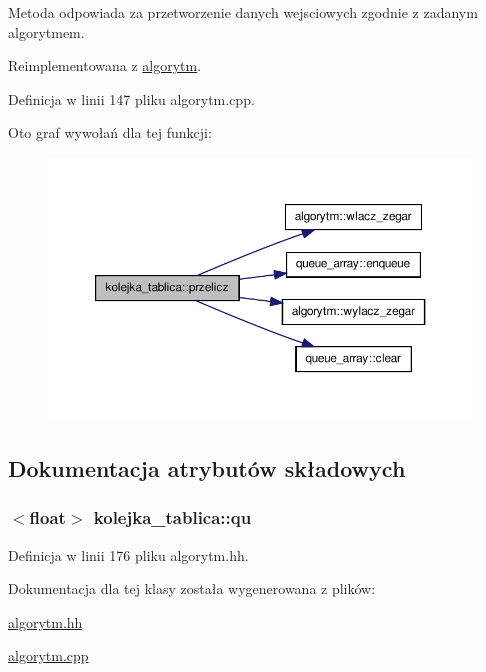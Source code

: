 \-Metoda odpowiada za przetworzenie danych wejsciowych zgodnie z zadanym algorytmem. 



\-Reimplementowana z \hyperlink{classalgorytm_af3f92bf537b1f2e1f93173983e838449}{algorytm}.



\-Definicja w linii 147 pliku algorytm.\-cpp.



\-Oto graf wywołań dla tej funkcji\-:
\nopagebreak
\begin{figure}[H]
\begin{center}
\leavevmode
\includegraphics[width=350pt]{classkolejka__tablica_aad6baa28ce61111666e70df7d6ac4f86_cgraph}
\end{center}
\end{figure}




\subsection{\-Dokumentacja atrybutów składowych}
\hypertarget{classkolejka__tablica_a7fd15c7c7a0fa3649042ec634b2b8d4f}{
\subsubsection[{qu}]{$<$float$>$ {\bf kolejka\-\_\-tablica\-::qu}}}\label{classkolejka__tablica_a7fd15c7c7a0fa3649042ec634b2b8d4f}


\-Definicja w linii 176 pliku algorytm.\-hh.



\-Dokumentacja dla tej klasy została wygenerowana z plików\-:\begin{DoxyCompactItemize}
\item 
\hyperlink{algorytm_8hh}{algorytm.\-hh}\item 
\hyperlink{algorytm_8cpp}{algorytm.\-cpp}\end{DoxyCompactItemize}
